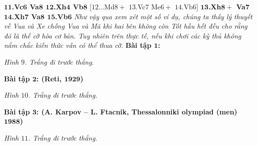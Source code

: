\begin{multicols}{2}
	\vskip 0.1cm
	\textbf{\color{gocco}$\pmb{11}$.Vc$\pmb{6}$ Va$\pmb{8}$ $\pmb{12}$.Xh$\pmb{4}$ Vb$\pmb{8}$} [$12$...Md$8+$ $13$.Vc$7$ Me$6+$ $14$.Vb$6$]
	\vskip 0.1cm
	\textbf{\color{gocco}$\pmb{13}$.Xh$\pmb{8+}$ Va$\pmb{7}$ $\pmb{14}$.Xh$\pmb{7}$ Va$\pmb{8}$ $\pmb{15}$.Vb$\pmb{6}$}
	\vskip 0.1cm
	\textit{Như vậy qua xem xét một số ví dụ, chúng ta thấy lý thuyết về Vua và Xe  chống Vua và Mã khi hai bên không còn Tốt hầu hết đều cho rằng đó là thế cờ hòa cơ bản. Tuy nhiên trên thực tế, nếu khi chơi các kỳ thủ không nắm chắc kiến thức vẫn có thể thua cờ.}
	\vskip 0.05cm
	\textbf{\color{gocco}Bài tập $\pmb{1}$:}
	\begin{center}
		\newgame
		\scalebox{0.85}\showboard
		\vskip 0.2cm
		\textit{\small\color{gocco}Hình $9$. Trắng đi trước thắng.}
	\end{center}
	\textbf{\color{gocco}Bài tập $\pmb{2}$: (Reti, $\pmb{1929}$)}
	\begin{center}
		\newgame
		\scalebox{0.85}\showboard
		\vskip 0.2cm
		\textit{\small\color{gocco}Hình $10$. Trắng đi trước thắng.}
	\end{center}
	\textbf{\color{gocco}Bài tập $\pmb{3}$: (A. Karpov -- L. Ftacnik, Thessalonniki olympiad (men) $\pmb{1988}$)}
	\begin{center}
		\newgame
		\scalebox{0.85}\showboard
		\vskip 0.2cm
		\textit{\small\color{gocco}Hình $11$. Trắng đi trước thắng.}
	\end{center}
%	
\end{multicols}
